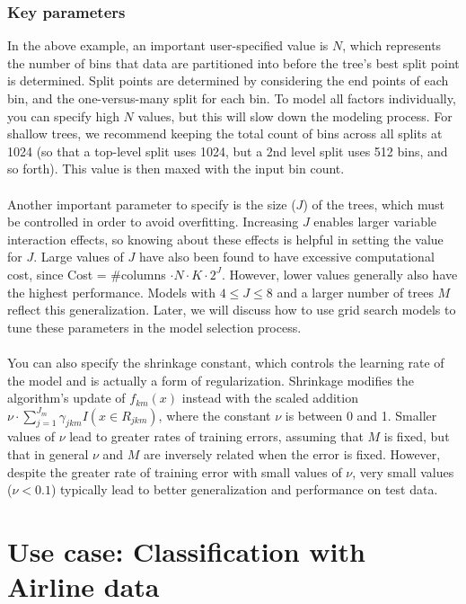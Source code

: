 \documentclass{article}[11pt]
\begin{document}
{\subsubsection{Key parameters}

In the above example, an important user-specified value is $N$, which represents the number of bins that data are partitioned into before the tree's best split point is determined. Split points are determined by considering the end points of each bin, and the one-versus-many split for each bin. To model all factors individually, you can specify high $N$ values, but this will slow down the modeling process. For shallow trees, we recommend keeping the total count of bins across all splits at 1024 (so that a top-level split uses 1024, but a 2nd level split uses 512 bins, and so forth). This value is then maxed with the input bin count.
\\
\\
Another important parameter to specify is the size ($J$) of the trees, which must be controlled in order to avoid overfitting. Increasing $J$ enables larger variable interaction effects, so knowing about these effects is helpful in setting the value for $J$. Large values of $J$ have also been found to have excessive computational cost, since Cost = \#columns $\cdot N \cdot K \cdot 2^{J}$. However, lower values generally also have the highest performance. Models with $4 \leq J \leq 8$ and a larger number of trees $M$ reflect this generalization. Later, we will discuss how to use grid search models to tune these parameters in the model selection process.
\\
\\
You can also specify the shrinkage constant, which controls the learning rate of the model and is actually a form of regularization. Shrinkage modifies the algorithm's update of $f_{km}(x)$ instead with the scaled addition $\nu \cdot \sum_{j=1}^{J_m} \gamma_{jkm} I(x \in R_{jkm})$, where the constant $\nu$ is between 0 and 1. Smaller values of $\nu$ lead to greater rates of training errors, assuming that $M$ is fixed, but that in general $\nu$ and $M$ are inversely related when the error is  fixed.
However, despite the greater rate of training error with small values of $\nu$, very small values ($\nu < 0.1$) typically lead to better generalization and performance on test data. 

\section{Use case: Classification with Airline data} 


}
\end{document}
